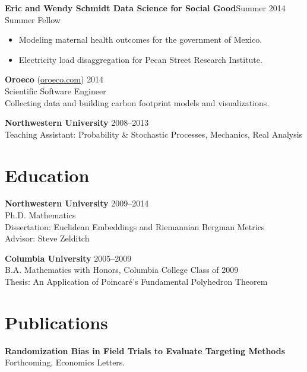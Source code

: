 \documentclass[margin,line]{resume}
\begin{document}
\begin{resume}
	{\bf Eric and Wendy Schmidt Data Science for Social Good}\hfill{Summer 2014}\\
	Summer Fellow
	\begin{itemize}
		\item Modeling maternal health outcomes for the government of Mexico.
		\item Electricity load disaggregation for Pecan Street Research Institute.
	\end{itemize}

	{\bf Oroeco} (\href{http://www.oroeco.com}{oroeco.com}) \hfill {2014} \\
	Scientific Software Engineer \\
	Collecting data and building carbon footprint models and visualizations. 

	{\bf Northwestern University} \hfill {2008--2013}\\
	Teaching Assistant: Probability \& Stochastic Processes, Mechanics, Real Analysis%
	

    \section{\mysidestyle Education}
	
	{\bf Northwestern University} \hfill {2009--2014} \\%
	Ph.D. Mathematics \\
	Dissertation: Euclidean Embeddings and Riemannian Bergman Metrics \\
	Advisor: Steve Zelditch 

	{\bf Columbia University} \hfill {2005--2009} \\%
    B.A. Mathematics with Honors, Columbia College Class of 2009 \\
	Thesis: An Application of Poincar\'e's Fundamental Polyhedron Theorem

	
	\section{\mysidestyle Publications}
        {\bf Randomization Bias in Field Trials to Evaluate Targeting Methods}\\
        Forthcoming, Economics Letters.


\end{resume}
\end{document}
